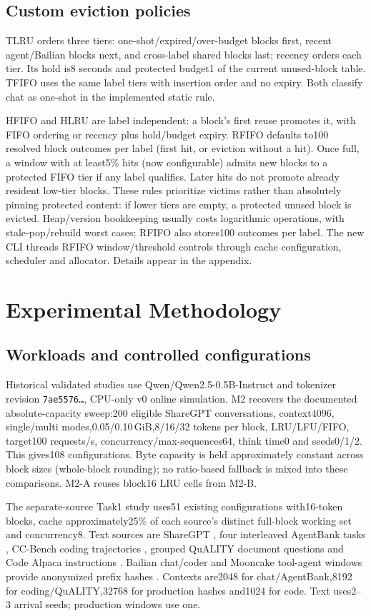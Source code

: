 \documentclass{article}
\begin{document}
\subsection{Custom eviction policies}
TLRU orders three tiers: one-shot/expired/over-budget blocks first, recent agent/Bailian blocks next, and cross-label shared blocks last; recency orders each tier. Its hold is8 seconds and protected budget1 of the current unused-block table. TFIFO uses the same label tiers with insertion order and no expiry. Both classify chat as one-shot in the implemented static rule.

HFIFO and HLRU are label independent: a block's first reuse promotes it, with FIFO ordering or recency plus hold/budget expiry. RFIFO defaults to100 resolved block outcomes per label (first hit, or eviction without a hit). Once full, a window with at least5\% hits (now configurable) admits new blocks to a protected FIFO tier if any label qualifies. Later hits do not promote already resident low-tier blocks. These rules prioritize victims rather than absolutely pinning protected content: if lower tiers are empty, a protected unused block is evicted. Heap/version bookkeeping usually costs logarithmic operations, with stale-pop/rebuild worst cases; RFIFO also stores100 outcomes per label. The new CLI threads RFIFO window/threshold controls through cache configuration, scheduler and allocator. Details appear in the appendix.

\section{Experimental Methodology}
\subsection{Workloads and controlled configurations}
Historical validated studies use Qwen/Qwen2.5-0.5B-Instruct and tokenizer revision \texttt{7ae5576\ldots}, CPU-only v0 online simulation. M2 recovers the documented absolute-capacity sweep:200 eligible ShareGPT conversations, context4096, single/multi modes,0.05/0.10\,GiB,8/16/32 tokens per block, LRU/LFU/FIFO, target100 requests/s, concurrency/max-sequences64, think time0 and seeds0/1/2. This gives108 configurations. Byte capacity is held approximately constant across block sizes (whole-block rounding); no ratio-based fallback is mixed into these comparisons. M2-A reuses block16 LRU cells from M2-B.

The separate-source Task1 study uses51 existing configurations with16-token blocks, cache approximately25\% of each source's distinct full-block working set and concurrency8. Text sources are ShareGPT \citep{sharegpt}, four interleaved AgentBank tasks \citep{agentbank}, CC-Bench coding trajectories \citep{ccbench}, grouped QuALITY document questions \citep{quality} and Code Alpaca instructions \citep{codealpaca}. Bailian chat/coder and Mooncake tool-agent windows provide anonymized prefix hashes \citep{bailian,mooncake}. Contexts are2048 for chat/AgentBank,8192 for coding/QuALITY,32768 for production hashes and1024 for code. Text uses2--3 arrival seeds; production windows use one.
\end{document}
